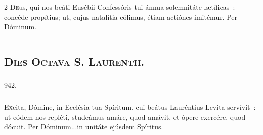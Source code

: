 \documentclass[9pt,twoside]{extarticle}
\begin{document}
\begin{multicols}{2}
\lettrine{D}eus, qui nos beáti Eusébii Confessóris tui ánnua solemnitáte lætíficas~: concéde propítius; ut, cujus natalítia cólimus, étiam actiónes imitémur. Per Dóminum.

\begin{tightlist}{}
\item {}
\item {}
\end{tightlist}

\begin{center}\textcolor{red}{\rule{\linewidth}{0.5pt}} \end{center}

\subsubsection*{\center {}}
\subsection*{\center \textsc{Dies Octava S. Laurentii.}}
\subsubsection*{\center {}}

\begin{tightlist}{}
\item {}
\item {} 942.
\end{tightlist}

\subsubsection*{\center {}}
\lettrine{E}xcita, Dómine, in Ecclésia tua Spíritum, cui beátus Lauréntius Levíta servívit~: ut eódem nos repléti, studeámus amáre, quod amávit, et ópere exercére, quod dócuit. Per Dóminum...in unitáte ejúsdem Spíritus.

\begin{tightlist}{}
\item {}}
\end{tightlist}

\end{multicols}
\end{document}
